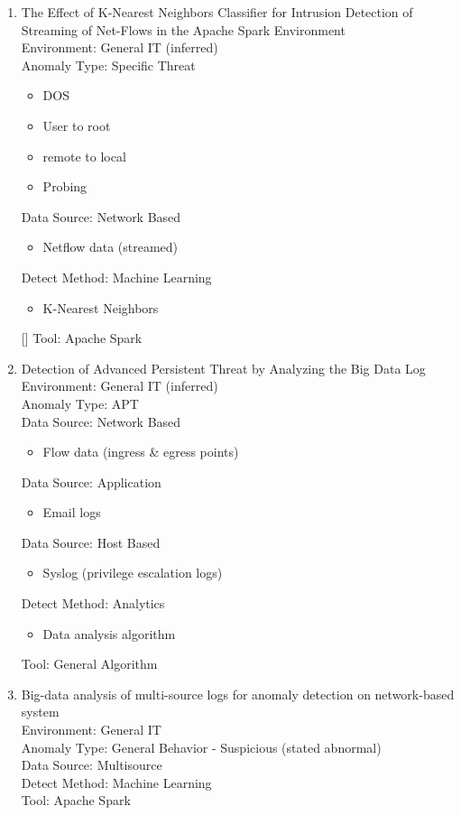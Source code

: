 \begin{enumerate}
    \item 
    The Effect of K-Nearest Neighbors Classifier for Intrusion Detection of Streaming of Net-Flows in the Apache Spark Environment\cite{thevar2017effect} \\
    Environment: General IT (inferred) \\
    Anomaly Type: Specific Threat
    \begin{itemize}
        \item DOS
        \item User to root
        \item remote to local
        \item Probing
    \end{itemize} 
    Data Source: Network Based
    \begin{itemize}
        \item Netflow data (streamed)
    \end{itemize} 
    Detect Method: Machine Learning
    \begin{itemize}
        \item K-Nearest Neighbors
    \end{itemize}[]
    Tool: Apache Spark 
    
    
    \item 
    Detection of Advanced Persistent Threat by Analyzing the Big Data Log\cite{kim2013detection}\\
    Environment: General IT (inferred)\\
    Anomaly Type: APT  \\
    Data Source: Network Based
    \begin{itemize}
        \item Flow data (ingress \& egress points)
    \end{itemize}
    Data Source: Application
    \begin{itemize}
        \item Email logs
    \end{itemize}
    Data Source: Host Based
    \begin{itemize}
        \item Syslog (privilege escalation logs)
    \end{itemize}
    Detect Method: Analytics
    \begin{itemize}
        \item Data analysis algorithm
    \end{itemize}
    Tool: General Algorithm
    
    \item 
    Big-data analysis of multi-source logs for anomaly detection on network-based system\cite{jia2017big}\\
    Environment: General IT \\
    Anomaly Type: General Behavior - Suspicious (stated abnormal)\\ 
    Data Source: Multisource\\ 
    Detect Method: Machine Learning\\ 
    Tool: Apache Spark 
    

\end{enumerate}
